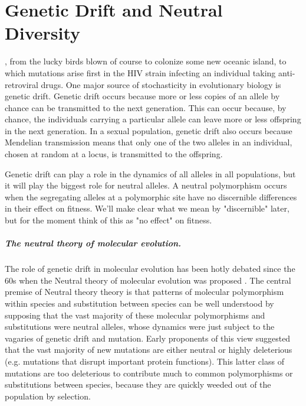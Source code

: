 \chapter{Genetic Drift and Neutral Diversity}
\label{Chapter:Drift}
, from the lucky birds blown of course to colonize some new oceanic island, to which mutations arise first in the HIV strain infecting an individual taking anti-retroviral drugs. One major source of stochasticity in evolutionary biology is genetic drift.  Genetic drift occurs because more or less copies of an allele by chance can be transmitted to the next generation. This can occur because, by chance, the individuals carrying a particular allele can leave more or less offspring in the next generation. In a
sexual population, genetic drift also occurs because Mendelian transmission
means that only one of the two alleles in an individual, chosen at random at a
locus, is transmitted to the offspring.

Genetic drift can play a role in the dynamics of all alleles in all populations, but it will play the biggest role for neutral alleles. A neutral polymorphism occurs when the segregating alleles at a polymorphic site have no discernible differences in their effect on fitness. We'll make clear what we mean by "discernible" later, but for
the moment think of this as "no effect" on fitness.
\paragraph{The neutral theory of molecular evolution.}
The role of genetic drift in molecular evolution has been hotly debated since the 60s when the Neutral theory of molecular evolution was proposed \citep[see ][ for a history]{ohta1996development}\cite{kimura:68,king:69,kimura:83}.  The central premise of Neutral theory theory is that patterns of molecular polymorphism within species and substitution between species can be well understood by supposing that the vast majority of these molecular polymorphisms and substitutions were neutral alleles, whose dynamics were just subject to the vagaries of genetic drift and mutation. Early proponents of this view suggested that the vast majority of new mutations are either neutral or highly deleterious (e.g. mutations that disrupt important protein functions). This latter class of mutations are too deleterious to contribute much to common polymorphisms or substitutions between species, because they are quickly weeded out of the population by selection.

